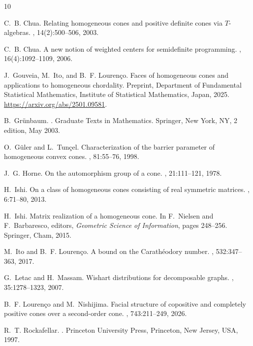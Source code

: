 \documentclass[oneside]{amsart}
\theoremstyle{plain}
\theoremstyle{definition}
\theoremstyle{remark}
\numberwithin{equation}{section}
\begin{document}
\begin{thebibliography}{10}

C.~B. Chua.
\newblock Relating homogeneous cones and positive definite cones via
  {$T$}-algebras.
, 14(2):500--506, 2003.

C.~B. Chua.
\newblock A new notion of weighted centers for semidefinite programming.
, 16(4):1092--1109, 2006.

J.~Gouveia, M.~Ito, and B.~F. Louren\c{c}o.
\newblock Faces of homogeneous cones and applications to homogeneous
  chordality.
\newblock Preprint, Department of Fundamental Statistical Mathematics,
  Institute of Statistical Mathematics, Japan, 2025.
\newblock \url{https://arxiv.org/abs/2501.09581}.

B.~Gr{\"{u}}nbaum.
.
\newblock Graduate Texts in Mathematics. Springer, New York, NY, 2 edition, May
  2003.

O.~G\"uler and L.~Tun\c{c}el.
\newblock Characterization of the barrier parameter of homogeneous convex
  cones.
, 81:55--76, 1998.

 J.~G. Horne.
\newblock On the automorphism group of a cone.
, 21:111--121, 1978.

H.~Ishi.
\newblock On a class of homogeneous cones consisting of real symmetric
  matrices.
, 6:71--80, 2013.

H.~Ishi.
\newblock Matrix realization of a homogeneous cone.
\newblock In F.~Nielsen and F.~Barbaresco, editors, {\em Geometric Science of
  Information}, pages 248--256. Springer, Cham, 2015.

M.~Ito and B.~F. Louren{\c{c}}o.
\newblock A bound on the {C}arath{\'e}odory number.
, 532:347--363, 2017.

 G.~Letac and H.~Massam.
\newblock Wishart distributions for decomposable graphs.
, 35:1278--1323, 2007.

 B.~F. Louren{\c{c}}o and M.~Nishijima.
\newblock Facial structure of copositive and completely positive cones over a
  second-order cone.
, 743:211--249, 2026.

R.~T. Rockafellar.
.
\newblock Princeton University Press, Princeton, New Jersey, USA, 1997.


\end{thebibliography}
\end{document}
